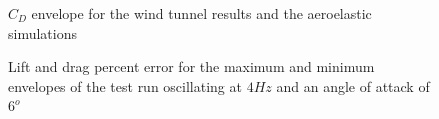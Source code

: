 \documentclass[11pt]{ucthesis}
\begin{document}
\begin{figure}
\hfill
{}
\hfill
{}
\hfill
\caption{$C_D$ envelope for the wind tunnel results and the aeroelastic simulations}
\label{fig:CDEnvelope}
\end{figure}

\begin{figure}
\hfill
{}
\hfill
{}
\hfill
\caption{Lift and drag percent error for the maximum and minimum envelopes of the test run oscillating at $4 Hz$ and an angle of attack of $6^o$}
\label{fig:PError5454}
\end{figure}
\end{document}
